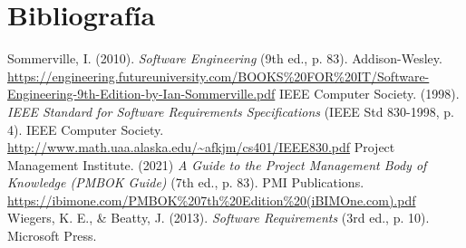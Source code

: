 \section*{Bibliografía}

\begin{thebibliography}{9}
Sommerville, I. (2010).
\textit{Software Engineering} (9th ed., p. 83).
Addison-Wesley.
\url{https://engineering.futureuniversity.com/BOOKS%20FOR%20IT/Software-Engineering-9th-Edition-by-Ian-Sommerville.pdf}
IEEE Computer Society. (1998).
\textit{IEEE Standard for Software Requirements Specifications} (IEEE Std 830-1998, p. 4).
IEEE Computer Society.
\url{http://www.math.uaa.alaska.edu/~afkjm/cs401/IEEE830.pdf}
Project Management Institute. (2021)
\textit{A Guide to the Project Management Body of Knowledge (PMBOK Guide)} (7th ed., p. 83).
PMI Publications.
\url{https://ibimone.com/PMBOK%207th%20Edition%20(iBIMOne.com).pdf}
Wiegers, K. E., \& Beatty, J. (2013).
\textit{Software Requirements} (3rd ed., p. 10).
Microsoft Press.
\end{thebibliography}